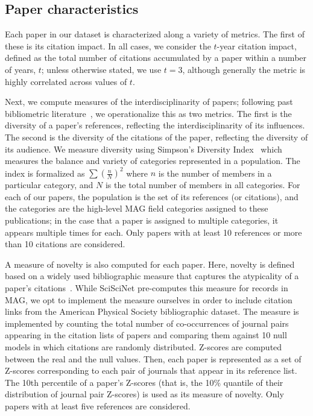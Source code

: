 \documentclass[12pt,a4paper]{article}
\numberwithin{equation}{section}
\begin{document}
\subsection*{Paper characteristics}
Each paper in our dataset is characterized along a variety of metrics. 
The first of these is its citation impact.
In all cases, we consider the $t$-year citation impact, defined as the total number of citations accumulated by a paper within a number of years, $t$;
unless otherwise stated, we use $t=3$, although generally the metric is highly correlated across values of $t$. 

Next, we compute measures of the interdisciplinarity of papers;
following past bibliometric literature~\cite{chen_2015_interdisciplinary}, we operationalize this as two metrics. 
The first is the diversity of a paper's references, reflecting the interdisciplinarity of its influences.
The second is the diversity of the citations of the paper, reflecting the diversity of its audience.
We measure diversity using Simpson's Diversity Index~\cite{simpson_1949_diversity} which measures the balance and variety of categories represented in a population. 
The index is formalized as $\sum{(\frac{n}{N})^{2}}$ where $n$ is the number of members in a particular category, and $N$ is the total number of members in all categories. 
For each of our papers, the population is the set of its references (or citations), and the categories are the high-level MAG field categories assigned to these publications; in the case that a paper is assigned to multiple categories, it appears multiple times for each. 
Only papers with at least 10 references or more than 10 citations are considered.

A measure of novelty is also computed for each paper. 
Here, novelty is defined based on a widely used bibliographic measure that captures the atypicality of a paper's citations~\cite{uzzi_2013_atypical}. 
While SciSciNet pre-computes this measure for records in MAG, we opt to implement the measure ourselves in order to include citation links from the American Physical Society bibliographic dataset.
The measure is implemented by counting the total number of co-occurrences of journal pairs appearing in the citation lists of papers and comparing them against 10 null models in which citations are randomly distributed.
Z-scores are computed between the real and the null values.
Then, each paper is represented as a set of Z-scores corresponding to each pair of journals that appear in its reference list.
The 10th percentile of a paper's Z-scores (that is, the 10\% quantile of their distribution of journal pair Z-scores) is used as its measure of novelty.
Only papers with at least five references are considered.
\end{document}
